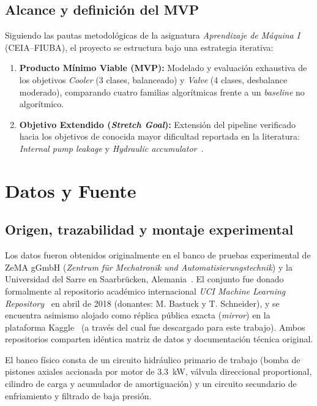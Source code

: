 \documentclass[journal]{IEEEtran}
\begin{document}
\subsection{Alcance y definición del MVP}

Siguiendo las pautas metodológicas de la asignatura \emph{Aprendizaje de Máquina I} (CEIA--FIUBA), el proyecto se estructura bajo una estrategia iterativa:
\begin{enumerate}[leftmargin=*]
    \item \textbf{Producto Mínimo Viable (MVP):} Modelado y evaluación exhaustiva de los objetivos \emph{Cooler} (3 clases, balanceado) y \emph{Valve} (4 clases, desbalance moderado), comparando cuatro familias algorítmicas frente a un \emph{baseline} no algorítmico.
    \item \textbf{Objetivo Extendido (\emph{Stretch Goal}):} Extensión del pipeline verificado hacia los objetivos de conocida mayor dificultad reportada en la literatura: \emph{Internal pump leakage} y \emph{Hydraulic accumulator}~\cite{Helwig2015, Schneider2017}.
\end{enumerate}

\section{Datos y Fuente}
\label{sec:datos}

\subsection{Origen, trazabilidad y montaje experimental}

Los datos fueron obtenidos originalmente en el banco de pruebas experimental de ZeMA gGmbH (\emph{Zentrum für Mechatronik und Automatisierungstechnik}) y la Universidad del Sarre en Saarbrücken, Alemania~\cite{Helwig2015, Helwig2015b}. El conjunto fue donado formalmente al repositorio académico internacional \emph{UCI Machine Learning Repository}~\cite{UCI_Dataset} en abril de 2018 (donantes: M. Bastuck y T. Schneider), y se encuentra asimismo alojado como réplica pública exacta (\emph{mirror}) en la plataforma Kaggle~\cite{Kaggle_Dataset} (a través del cual fue descargado para este trabajo). Ambos repositorios comparten idéntica matriz de datos y documentación técnica original.

El banco físico consta de un circuito hidráulico primario de trabajo (bomba de pistones axiales accionada por motor de \SI{3.3}{\kilo\watt}, válvula direccional proportional, cilindro de carga y acumulador de amortiguación) y un circuito secundario de enfriamiento y filtrado de baja presión.
\end{document}
